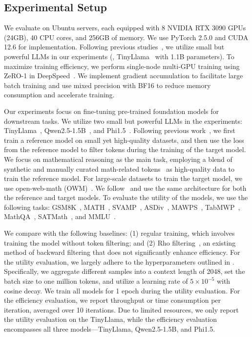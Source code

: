 \subsection{Experimental Setup} \label{sec:eval:setup}

 We evaluate \solution on Ubuntu servers, each equipped with 8 NVIDIA RTX 3090 GPUs (24GB), 40 CPU cores, and 256GB of memory. We use PyTorch 2.5.0 and CUDA 12.6 for implementation. Following previous studies~\cite{RHO}, we utilize small but powerful LLMs in our experiments (\eg, TinyLlama~\cite{tinyllama} with 1.1B parameters). To maximize training efficiency, we perform single-node multi-GPU training using ZeRO-1 in DeepSpeed~\cite{deepspeed}. We implement gradient accumulation to facilitate large batch training and use mixed precision with BF16 to reduce memory consumption and accelerate training.


 Our experiments focus on fine-tuning pre-trained foundation models for downstream tasks. We utilize two small but powerful LLMs in the experiments: TinyLlama~\cite{tinyllama}, Qwen2.5-1.5B~\cite{qwen2}, and Phi1.5~\cite{Phi1.5}. Following previous work~\cite{RHO}, we first train a reference model on small yet high-quality datasets, and then use the loss from the reference model to filter tokens during the training of the target model. 
We focus on mathematical reasoning as the main task, employing a blend of synthetic and manually curated math-related tokens~\cite{yu2023metamath,yue2023mammoth,mitra2024orcamath,DBLP:conf/naacl/AminiGLKCH19,DBLP:conf/acl/WangLSXDLCWS24} as high-quality data to train the reference model. For large-scale datasets to train the target model, we use open-web-math (OWM)~\cite{DBLP:conf/iclr/PasterSAB24}. We follow~\cite{RHO} and use the same architecture for both the reference and target models.
To evaluate the utility of the models, we use the following tasks: GSM8K~\cite{GSM8K}, MATH~\cite{DBLP:conf/iclr/LightmanKBEBLLS24}, SVAMP~\cite{SVAMP}, ASDiv~\cite{ASDiv}, MAWPS~\cite{MAWPS}, TabMWP~\cite{TabMWP}, MathQA~\cite{MathQA}, SATMath~\cite{SATMath}, and MMLU~\cite{MMLU}.

 We compare \solution with the following baselines: (1) regular training, which involves training the model without token filtering; and (2) Rho filtering~\cite{RHO}, an existing method of backward filtering that does not significantly enhance efficiency.
For the utility evaluation, we largely adhere to the hyperparameters outlined in \cite{RHO}. Specifically, we aggregate different samples into a context length of 2048, set the batch size to one million tokens, and utilize a learning rate of $5 \times 10^{-5}$ with cosine decay. We train all models for 1 epoch during the utility evaluation.
For the efficiency evaluation, we report throughput or time consumption per iteration, averaged over 10 iterations. Due to limited resources, we only report the utility evaluation on the TinyLlama, while the efficiency evaluation encompasses all three models---TinyLlama, Qwen2.5-1.5B, and Phi1.5.

